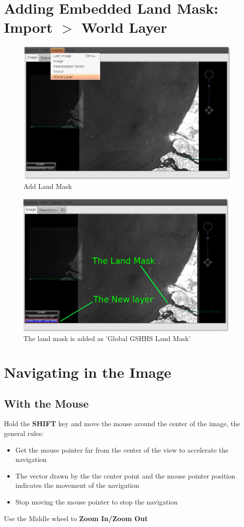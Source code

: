 \documentclass[12pt,a4paper,final]{report}
\begin{document}
\section{Adding Embedded Land Mask: Import $>$ World Layer}
\begin{figure}[H]
 \centering
 \includegraphics[scale=0.45,keepaspectratio=true]{./images/LandMask1.png}
 \caption{Add Land Mask}
\end{figure}
\begin{figure}[H]
 \centering
 \includegraphics[scale=0.45,keepaspectratio=true]{./images/LandMask2.png}
 \caption{The land mask is added as 'Global GSHHS Land Mask'}
\end{figure}

\section{Navigating in the Image}
\subsection{With the Mouse}
Hold the \textbf{SHIFT} key and move the mouse around the center of the image, the general rules:
\begin{itemize}
 \item Get the mouse pointer far from the center of the view to accelerate the navigation
 \item The vector drawn by the the center point and the mouse pointer position indicates the movement of the navigation
 \item Stop moving the mouse pointer to stop the navigation
\end{itemize}
Use the Middle wheel to \textbf{Zoom In/Zoom Out}
\end{document}

